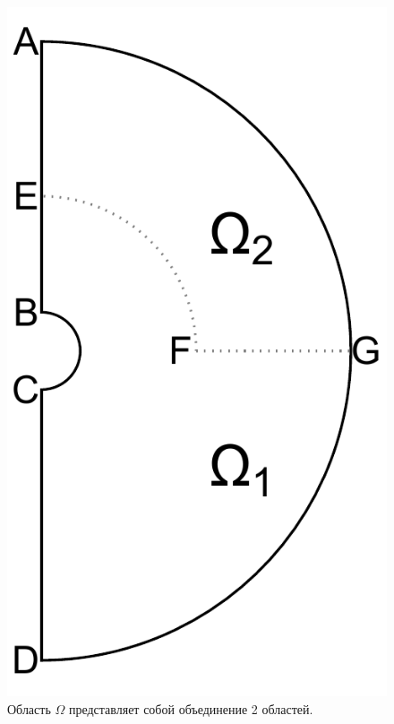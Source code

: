 \begin{figure}[!htb]
\centering
\includegraphics[scale=0.3]{images/section3_circular/domain.pdf}
    \caption{Область $\Omega$ представляет собой объединение 2 областей.}
    \label{fig:pt10:_domain}
\end{figure}


